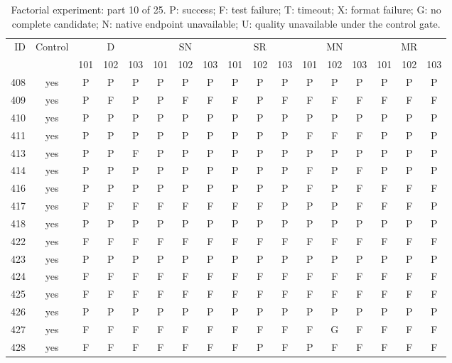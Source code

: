 \begin{table}[p]\centering\footnotesize
\setlength{\tabcolsep}{3pt}
\caption{Factorial experiment: part 10 of 25. P: success; F: test failure; T: timeout; X: format failure; G: no complete candidate; N: native endpoint unavailable; U: quality unavailable under the control gate.}
\begin{tabular*}{\textwidth}{@{\extracolsep{\fill}}rcccccccccccccccc}\toprule
ID & Control & \multicolumn{3}{c}{D} & \multicolumn{3}{c}{SN} & \multicolumn{3}{c}{SR} & \multicolumn{3}{c}{MN} & \multicolumn{3}{c}{MR}\\
\cmidrule(lr){3-5}\cmidrule(lr){6-8}\cmidrule(lr){9-11}\cmidrule(lr){12-14}\cmidrule(lr){15-17}
 & & 101 & 102 & 103 & 101 & 102 & 103 & 101 & 102 & 103 & 101 & 102 & 103 & 101 & 102 & 103\\\midrule
408 & yes & P & P & P & P & P & P & P & P & P & P & P & P & P & P & P\\
409 & yes & P & F & P & P & F & F & F & P & F & F & F & F & F & F & F\\
410 & yes & P & P & P & P & P & P & P & P & P & P & P & P & P & P & P\\
411 & yes & P & P & P & P & P & P & P & P & P & F & F & F & P & P & P\\
413 & yes & P & P & F & P & P & P & P & P & P & P & P & P & P & P & P\\
414 & yes & P & P & P & P & P & P & P & P & P & F & P & F & P & P & P\\
416 & yes & P & P & P & P & P & P & P & P & P & F & P & F & F & F & F\\
417 & yes & F & F & F & F & F & F & F & F & P & P & P & F & F & F & P\\
418 & yes & P & P & P & P & P & P & P & P & P & P & P & P & P & P & P\\
422 & yes & F & F & F & F & F & F & F & F & F & F & F & F & F & F & F\\
423 & yes & P & P & P & P & P & P & P & P & P & P & P & P & P & P & P\\
424 & yes & F & F & F & F & F & F & F & F & F & F & F & F & F & F & F\\
425 & yes & F & F & F & F & F & F & F & F & F & F & F & F & F & F & F\\
426 & yes & P & P & P & P & P & P & P & P & P & P & P & P & P & P & P\\
427 & yes & F & F & F & F & F & F & F & F & F & F & G & F & F & F & F\\
428 & yes & F & F & F & F & F & F & F & P & F & P & F & F & F & F & F\\

\end{tabular*}
\end{table}
